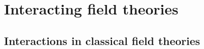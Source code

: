 \documentclass[main.tex]{subfiles}
\begin{document}
\chapter{Interacting field theories}

\section{Interactions in classical field theories}

\end{document}
